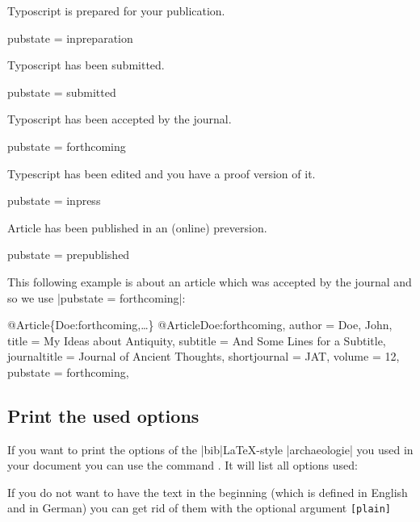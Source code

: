 \documentclass[a4paper,
10pt,
greek,
french,
spanish,
italian,
ngerman,
english
]{ltxdoc}
\begin{document}
Typoscript is prepared for your publication. 
\begin{code}
pubstate = {inpreparation}
\end{code}

Typoscript has been submitted.
\begin{code}
pubstate = {submitted}
\end{code}

Typoscript has been accepted by the journal.
\begin{code}
pubstate = {forthcoming}
\end{code}

Typescript has been edited and you have a proof version of it.
\begin{code}
pubstate = {inpress}
\end{code}

Article has been published in an (online) preversion.
\begin{code}
pubstate = {prepublished}
\end{code}


This following example is about an article which was accepted by the journal and so we use |pubstate = {forthcoming}|:
\begin{bibexample}[label=Doe:forthcoming]{{@}Article\{Doe:forthcoming,…\}}
@Article{Doe:forthcoming,
  author       = {Doe, John},
  title        = {My Ideas about Antiquity},
  subtitle     = {And Some Lines for a Subtitle},
  journaltitle = {Journal of Ancient Thoughts},
  shortjournal = {JAT},
  volume       = {12},
  pubstate     = {forthcoming},
}
\end{bibexample}



\subsection{Print the used options}
If you want to print the options  of the |bib|\LaTeX -style |archaeologie| you used in your document you can use the command .
It will list all options used:
\begin{otherlanguage}{ngerman}
\begin{example}
\archaeologieoptions
\end{example}
\end{otherlanguage}
If you do not want to have the text in the beginning (which is defined in English and in German) you can get rid of them with the optional argument  \texttt{[plain]}
\begin{example}
\archaeologieoptions[plain]
\end{example}
\end{document}
